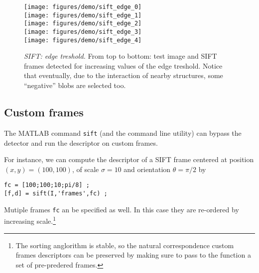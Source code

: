 \documentclass[9.5pt]{article}
\newcommand{\cmd}  [1]{{\color{red}\tt   #1}}
\begin{document}
\begin{figure}[h]
\begin{center}
\texttt{[image: figures/demo/sift\_edge\_0]}\\
\texttt{[image: figures/demo/sift\_edge\_1]}\\
\texttt{[image: figures/demo/sift\_edge\_2]}\\
\texttt{[image: figures/demo/sift\_edge\_3]}\\
\texttt{[image: figures/demo/sift\_edge\_4]}
\end{center}
\caption{{\em SIFT: edge treshold.} From top to bottom: test image and
  SIFT frames detected for increasing values of the edge
  treshold. Notice that eventually, due to the interaction of nearby
  structures, some ``negative'' blobs are selected too.}
\label{fig:sift-edge-tresh}
\end{figure}

\subsection{Custom frames}\label{sift.custom}

The MATLAB command \cmd{sift} (and the command line utility) can
bypass the detector and run the descriptor on custom frames.


For instance, we can compute the descriptor of a SIFT frame centered
at position $(x,y)=(100,100)$, of scale $\sigma=10$ and orientation
$\theta=\pi/2$ by
\begin{verbatim}
fc = [100;100;10;pi/8] ;
[f,d] = sift(I,'frames',fc) ;
\end{verbatim}
Mutiple frames \verb$fc$ an be specified as well. In this case they
are re-ordered by increasing scale.\footnote{The sorting anglorithm is
  stable, so the natural correspondence custom frames descriptors can
  be preserved by making sure to pass to the function a set of
  pre-predered frames.}
\end{document}
